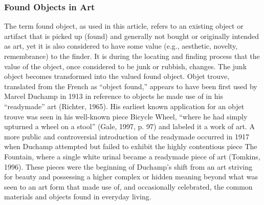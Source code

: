 

\subsubsection{Found Objects in Art}
The term found object, as used in this article, refers to an existing object or artifact that is picked up (found) and generally not bought or originally intended as art, yet it is also considered to have some value (e.g., aesthetic, novelty, remembrance) to the finder. It is during the locating and finding process that the value of the object, once considered to be junk or rubbish, changes. The junk object becomes transformed into the valued found object. Objet trouve, translated from the French as “object found,” appears to have been first used by Marcel Duchamp in 1913 in reference to objects he made use of in his “readymade” art (Richter, 1965). His earliest known application for an objet trouve was seen in his well-known piece Bicycle Wheel, “where he had simply upturned a wheel on a stool” (Gale, 1997, p. 97) and labeled it a work of art. A more public and controversial introduction of the readymade occurred in 1917 when Duchamp attempted but failed to exhibit the highly contentious piece The Fountain, where a single white urinal became a readymade piece of art (Tomkins, 1996). These pieces were the beginning of Duchamp’s shift from an art striving for beauty and possessing a higher complex or hidden meaning beyond what was seen to an art form that made use of, and occasionally celebrated, the common materials and objects found in everyday living.

